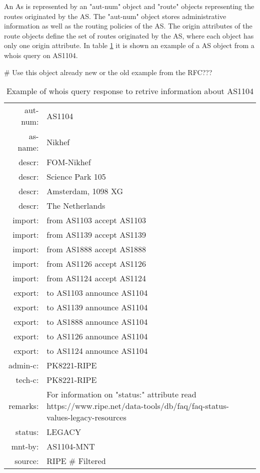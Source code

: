 \documentclass[11pt,a4paper]{scrreprt}
\begin{document}
An As is represented by an "aut-num" object and "route" objects representing the routes originated by the AS. The "aut-num" object stores administrative information as well as the routing policies of the AS. The origin attributes of the route objects define the set of routes originated by the AS, where each object has only one origin attribute. In table \ref{table:4} it is shown an example of a AS object from a whois query on AS1104.  
    
\# Use this object already new or the old example from the RFC???

\begin{table}[h!]
\centering
\begin{tabular}{  r  l  }

aut-num:    &      	AS1104\\
as-name:    &      	Nikhef\\
descr:   	&     	FOM-Nikhef\\
descr:   	&    	Science Park 105\\
descr:		&   	Amsterdam, 1098 XG\\
descr:   	&	    The Netherlands\\
import:  	&       from AS1103 accept AS1103\\
import:  	&       from AS1139 accept AS1139\\
import:  	&       from AS1888 accept AS1888\\
import:  	&       from AS1126 accept AS1126\\
import:  	&       from AS1124 accept AS1124\\
export:  	&       to AS1103 announce AS1104\\
export:  	&       to AS1139 announce AS1104\\
export:  	&       to AS1888 announce AS1104\\
export:  	&       to AS1126 announce AS1104\\
export:  	&       to AS1124 announce AS1104\\
admin-c: 	&       PK8221-RIPE\\
tech-c:  	&       PK8221-RIPE\\
remarks: 	&       For information on "status:" attribute read https://www.ripe.net/data-tools/db/faq/faq-status-values-legacy-resources\\
status:  	&       LEGACY\\
mnt-by:  	&       AS1104-MNT\\
source:  	&       RIPE \# Filtered\\

\end{tabular}
\caption{Example of whois query response to retrive information about AS1104}
\label{table:4}
\end{table} 
\end{document}
